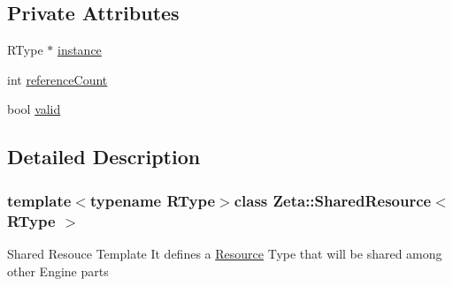 \subsection*{Private Attributes}
\begin{DoxyCompactItemize}
\item 
R\+Type $\ast$ \hyperlink{classZeta_1_1SharedResource_ac9580c623e0c67cdcc4dadb34ceebba1}{instance}
\item 
int \hyperlink{classZeta_1_1SharedResource_ac2cba2af1e886b9e371f9055b4f67097}{reference\+Count}
\item 
bool \hyperlink{classZeta_1_1SharedResource_aeff02cb931824d567b4f028b733e5ca1}{valid}
\end{DoxyCompactItemize}


\subsection{Detailed Description}
\subsubsection*{template$<$typename R\+Type$>$class Zeta\+::\+Shared\+Resource$<$ R\+Type $>$}

Shared Resouce Template It defines a \hyperlink{classZeta_1_1Resource}{Resource} Type that will be shared among other Engine parts 

